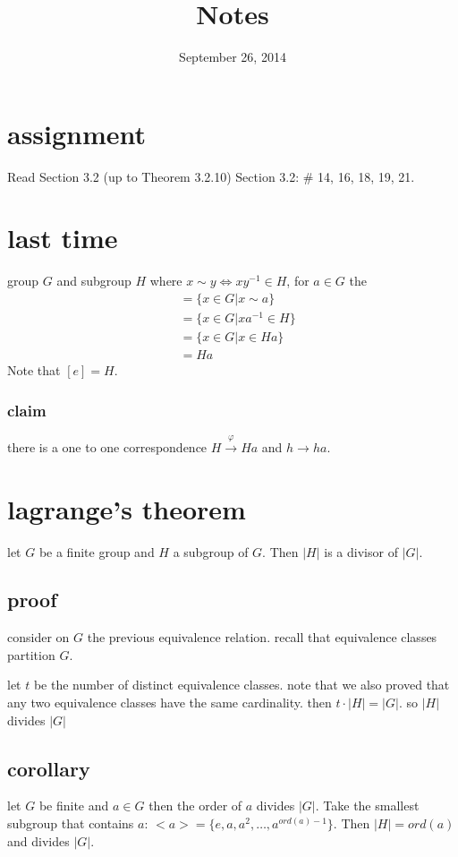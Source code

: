 \documentclass[letterpaper]{article}
\begin{document}
\title{Notes}
\date{September 26, 2014}
\maketitle
\section*{assignment}
Read Section 3.2 (up to Theorem 3.2.10)
Section 3.2: \# 14, 16, 18, 19, 21.

\section*{last time}
group $G$ and subgroup $H$ where $x\sim y\Leftrightarrow xy^{-1}\in H$, for $a\in G$ the
\begin{align*}
  [a]&=\{x\in G|x\sim a\}\\
  &=\{x\in G|xa^{-1}\in H\}\\
  &=\{x\in G|x\in Ha\}\\
  &=Ha
\end{align*}
Note that $[e]=H$.

\subsubsection*{claim}
there is a one to one correspondence $H\xrightarrow{\varphi}Ha$ and $h\to ha$.
\section*{lagrange's theorem}
let $G$ be a finite group and $H$ a subgroup of $G$. Then $|H|$ is a divisor of $|G|$.

\subsection*{proof}
consider on $G$ the previous equivalence relation. recall that equivalence classes partition $G$.

let $t$ be the number of distinct equivalence classes. note that we also proved that any two equivalence classes have the same cardinality. then $t\cdot |H|=|G|$. so $|H|$ divides $|G|$

\subsection*{corollary}
let $G$ be finite and $a\in G$ then the order of $a$ divides $|G|$. Take the smallest subgroup that contains $a$: $<a>=\{e,a,a^2,\dots,a^{ord(a)-1}\}$. Then $|H|=ord(a)$ and divides $|G|$.
\end{document}
